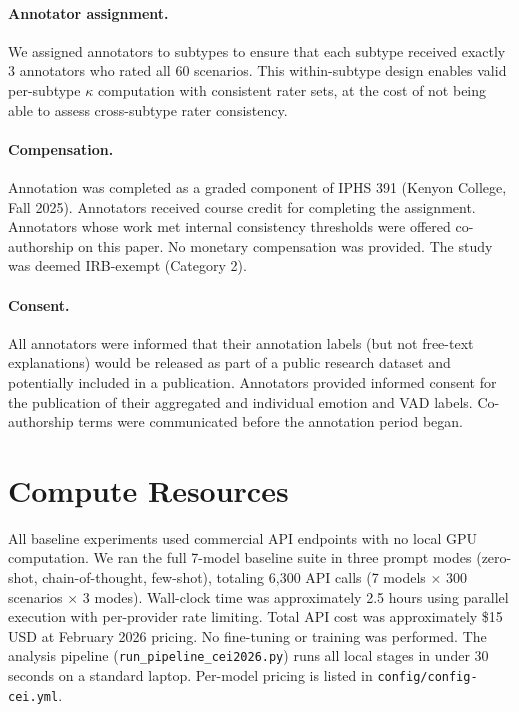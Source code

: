 \documentclass[twoside,11pt]{article}
\begin{document}
\paragraph{Annotator assignment.} We assigned annotators to subtypes to ensure that each subtype received exactly 3 annotators who rated all 60 scenarios. This within-subtype design enables valid per-subtype $\kappa$ computation with consistent rater sets, at the cost of not being able to assess cross-subtype rater consistency.

\paragraph{Compensation.} Annotation was completed as a graded component of IPHS 391 (Kenyon College, Fall 2025). Annotators received course credit for completing the assignment. Annotators whose work met internal consistency thresholds were offered co-authorship on this paper. No monetary compensation was provided. The study was deemed IRB-exempt (Category 2).

\paragraph{Consent.} All annotators were informed that their annotation labels (but not free-text explanations) would be released as part of a public research dataset and potentially included in a publication. Annotators provided informed consent for the publication of their aggregated and individual emotion and VAD labels. Co-authorship terms were communicated before the annotation period began.

\section{Compute Resources}
\label{app:compute}

All baseline experiments used commercial API endpoints with no local GPU computation. We ran the full 7-model baseline suite in three prompt modes (zero-shot, chain-of-thought, few-shot), totaling 6,300 API calls (7 models $\times$ 300 scenarios $\times$ 3 modes). Wall-clock time was approximately 2.5 hours using parallel execution with per-provider rate limiting. Total API cost was approximately \$15 USD at February 2026 pricing. No fine-tuning or training was performed. The analysis pipeline (\texttt{run\_pipeline\_cei2026.py}) runs all local stages in under 30 seconds on a standard laptop. Per-model pricing is listed in \texttt{config/config-cei.yml}.
\end{document}
